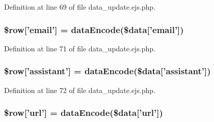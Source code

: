 \-Definition at line 69 of file data\-\_\-update.\-ejs.\-php.

\hypertarget{miscellaneous_2mysettings_2data__update_8ejs_8php_a40ee16d8fb0e37c2da5cf0da20f73f1d}{
\subsubsection[{\$row}]{\setlength{\rightskip}{0pt plus 5cm}\$row\mbox{[}'email'\mbox{]} = {\bf data\-Encode}(\$data\mbox{[}'email'\mbox{]})}}\label{miscellaneous_2mysettings_2data__update_8ejs_8php_a40ee16d8fb0e37c2da5cf0da20f73f1d}


\-Definition at line 71 of file data\-\_\-update.\-ejs.\-php.

\hypertarget{miscellaneous_2mysettings_2data__update_8ejs_8php_ac70ddecf301c4fec9f747b5c7c861243}{
\subsubsection[{\$row}]{\setlength{\rightskip}{0pt plus 5cm}\$row\mbox{[}'assistant'\mbox{]} = {\bf data\-Encode}(\$data\mbox{[}'assistant'\mbox{]})}}\label{miscellaneous_2mysettings_2data__update_8ejs_8php_ac70ddecf301c4fec9f747b5c7c861243}


\-Definition at line 72 of file data\-\_\-update.\-ejs.\-php.

\hypertarget{miscellaneous_2mysettings_2data__update_8ejs_8php_adf1010d02c9d45b59dd4435673a49506}{
\subsubsection[{\$row}]{\setlength{\rightskip}{0pt plus 5cm}\$row\mbox{[}'url'\mbox{]} = {\bf data\-Encode}(\$data\mbox{[}'url'\mbox{]})}}\label{miscellaneous_2mysettings_2data__update_8ejs_8php_adf1010d02c9d45b59dd4435673a49506}



